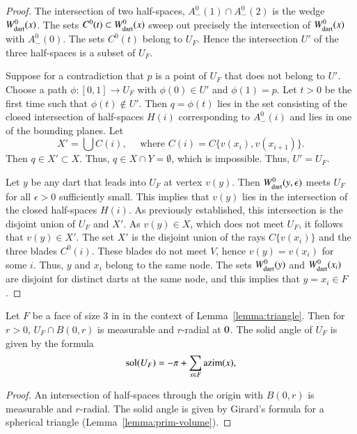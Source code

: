 \begin{proof} The intersection of two half-spaces, $A^0_-(1)\cap A^0_-(2)$ is
the wedge $W^0_{\text{dart}}(x)$.   The sets $C^0(t)\subset W^0_{\text{dart}}(x)$ sweep out precisely
the intersection of $W^0_{\text{dart}}(x)$ with $A^0_-(0)$.  The sets $C^0(t)$ belong to
$U_F$.  Hence the intersection $U'$ of the three half-spaces is a subset of $U_F$.

Suppose for a contradiction 
that $p$ is a point of $U_F$ that does not belong to $U'$.  Choose a path $\phi:[0,1]\to U_F$ with $\phi(0)\in U'$ and $\phi(1)=p$.  Let $t>0$ be the first time such that $\phi(t)\not\in U'$.  Then $q=\phi(t)$ lies in the set consisting of the closed intersection of half-spaces $H(i)$ corresponding to $A^0_-(i)$ and lies
in one of the bounding planes.  Let 
$$
X' = \bigcup C(i),\quad\text{ where } C(i)=C\{v(x_i),v(x_{i+1})\}.
$$
Then $q\in X'\subset X$.  Thus,
$q\in X\cap Y = \emptyset$, which is impossible.  Thus, $U'=U_F$.

Let $y$ be any dart that leads into $U_F$ at vertex $v(y)$.  Then
$W^0_{\text{dart}}(y,\epsilon)$ meets $U_F$ for all $\epsilon>0$ sufficiently small.
This implies that $v(y)$ lies in the intersection of the closed half-spaces $H(i)$.  As previously established, this intersection is the disjoint union of $U_F$ and
$X'$.  As $v(y)\in X$, which does not meet $U_F$, it follows that $v(y)\in X'$.
The set $X'$ is the disjoint union of the rays $C\{v(x_i)\}$ and
the three blades $C^0(i)$.  These blades do not meet $V$, hence
$v(y)=v(x_i)$ for some $i$.  Thus, $y$ and $x_i$ belong to the same
node.  The sets $W^0_{\text{dart}}(y)$ and $W^0_{\text{dart}}( x_i)$ are disjoint for distinct darts at the same
node, and this implies that $y=x_i\in F$.
\end{proof}

\begin{corollary}\label{lemma:girard-component}
Let $F$ be a face of size $3$ in in the context of Lemma~\ref{lemma:triangle}.  Then for $r>0$, $U_F \cap B(0,r)$ is measurable and $r$-radial at $0$.
The solid angle of $U_F$ is given by the formula
$$
\operatorname{sol}(U_F) = -\pi + \sum_{x\in F}{\operatorname{azim}}(x),
$$
\end{corollary}

\begin{proof} An intersection of half-spaces through the origin 
with $B(0,r)$ is measurable and
$r$-radial.  The solid angle is given by Girard's formula for
a spherical triangle (Lemma~\ref{lemma:prim-volume}).
\end{proof}

